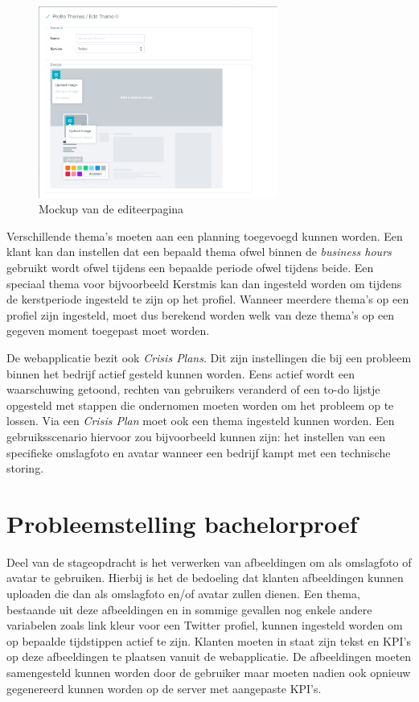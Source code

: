 \begin{figure}[H]
	\centering
	\includegraphics[width=0.7\textwidth]{Figuren/EditThemeMockup.png}
	\caption{Mockup van de editeerpagina \cite{EditThemeMockup}} %
	\label{fig:EditTheme}
\end{figure} 

Verschillende thema's moeten aan een planning toegevoegd kunnen worden. Een klant kan dan instellen dat een bepaald thema ofwel binnen de \textit{business hours} gebruikt wordt ofwel tijdens een bepaalde periode ofwel tijdens beide. Een speciaal thema voor bijvoorbeeld Kerstmis kan dan ingesteld worden om tijdens de kerstperiode ingesteld te zijn op het profiel. Wanneer meerdere thema's op een profiel zijn ingesteld, moet dus berekend worden welk van deze thema's op een gegeven moment toegepast moet worden. 

\newpage
De webapplicatie bezit ook \textit{Crisis Plans}. Dit zijn instellingen die bij een probleem binnen het bedrijf actief gesteld kunnen worden. Eens actief wordt een waarschuwing getoond, rechten van gebruikers veranderd of een to-do lijstje opgesteld met stappen die ondernomen moeten worden om het probleem op te lossen. Via een \textit{Crisis Plan} moet ook een thema ingesteld kunnen worden. Een gebruiksscenario hiervoor zou bijvoorbeeld kunnen zijn: het instellen van een specifieke omslagfoto en avatar wanneer een bedrijf kampt met een technische storing. 

\section{\textbf{Probleemstelling bachelorproef}}

Deel van de stageopdracht is het verwerken van afbeeldingen om als omslagfoto of avatar te gebruiken. Hierbij is het de bedoeling dat klanten afbeeldingen kunnen uploaden die dan als omslagfoto en/of avatar zullen dienen. Een thema, bestaande uit deze afbeeldingen en in sommige gevallen nog enkele andere variabelen zoals link kleur voor een Twitter profiel, kunnen ingesteld worden om op bepaalde tijdstippen actief te zijn. Klanten moeten in staat zijn tekst en KPI's op deze afbeeldingen te plaatsen vanuit de webapplicatie. De afbeeldingen moeten samengesteld kunnen worden door de gebruiker maar moeten nadien ook opnieuw gegenereerd kunnen worden op de server met aangepaste KPI's. 

